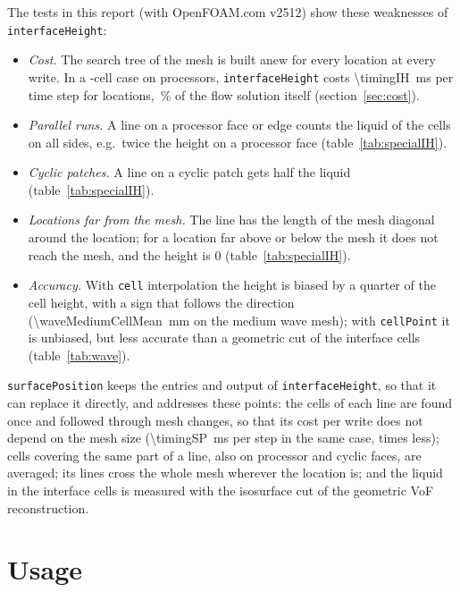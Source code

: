 \documentclass[11pt,a4paper]{article}
\newcommand{\sP}{\texttt{surfacePosition}}
\newcommand{\iH}{\texttt{interfaceHeight}}
\begin{document}
The tests in this report (with OpenFOAM.com v2512) show these weaknesses of
\iH{}:
\begin{itemize}
\item \emph{Cost.} The search tree of the mesh is built anew for every
  location at every write. In a \timingCells-cell case on \timingProcs{}
  processors, \iH{} costs \SI{\timingIH}{ms} per time step for \timingLines{}
  locations, \timingIHFraction{}\,\% of the flow solution itself
  (section~\ref{sec:cost}).
\item \emph{Parallel runs.} A line on a processor face or edge counts the
  liquid of the cells on all sides, e.g.\ twice the height on a processor
  face (table~\ref{tab:specialIH}).
\item \emph{Cyclic patches.} A line on a cyclic patch gets half the liquid
  (table~\ref{tab:specialIH}).
\item \emph{Locations far from the mesh.} The line has the length of the mesh
  diagonal around the location; for a location far above or below the mesh it
  does not reach the mesh, and the height is 0 (table~\ref{tab:specialIH}).
\item \emph{Accuracy.} With \texttt{cell} interpolation the height is biased
  by a quarter of the cell height, with a sign that follows the direction
  (\SI{\waveMediumCellMean}{mm} on the medium wave mesh); with
  \texttt{cellPoint} it is unbiased, but less accurate than a geometric cut
  of the interface cells (table~\ref{tab:wave}).
\end{itemize}
\sP{} keeps the entries and output of \iH{}, so that it can replace it
directly, and addresses these points: the cells of each line are found once
and followed through mesh changes, so that its cost per write does not depend
on the mesh size (\SI{\timingSP}{ms} per step in the same case,
\timingRatio{} times less); cells covering the same part of a line, also on
processor and cyclic faces, are averaged; its lines cross the whole mesh
wherever the location is; and the liquid in the interface cells is measured
with the isosurface cut of the geometric VoF reconstruction.

\section{Usage}
\end{document}
